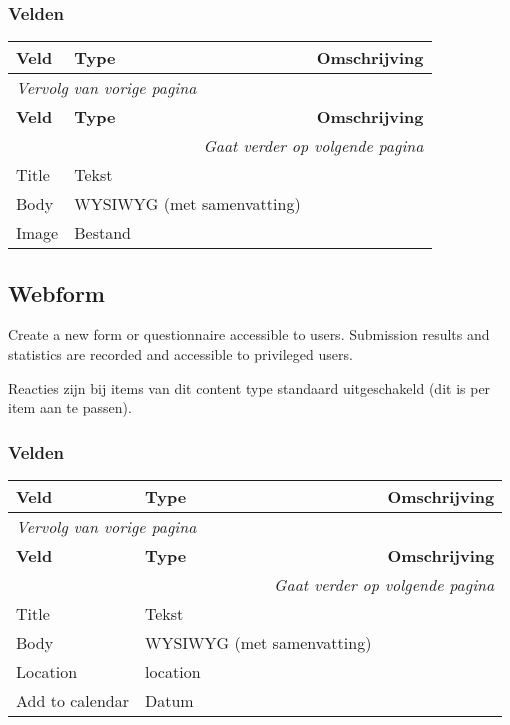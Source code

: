 \subsubsection{Velden}
  \begin{longtable}{| p{3.75cm}|p{3.75cm}|p{7.50cm}|}
  \hline
  \rowcolor{tableheader}
  \textbf{Veld} & \textbf{Type} & \textbf{Omschrijving}  \tabularnewline
  \hline
\endfirsthead
\multicolumn{3}{l}{\textit{Vervolg van vorige pagina}} \\
\hline
\rowcolor{tableheader}
  \textbf{Veld} & \textbf{Type} & \textbf{Omschrijving}  \tabularnewline
  \hline
\hline
\endhead
\multicolumn{3}{r}{\textit{Gaat verder op volgende pagina}} \\
\endfoot
\hline
\endlastfoot
  \raggedright{Title} & \raggedright{Tekst} & \raggedright{}  \tabularnewline
  \hline
  \raggedright{Body} & \raggedright{WYSIWYG (met samenvatting)} & \raggedright{}  \tabularnewline
  \hline
  \raggedright{Image} & \raggedright{Bestand} & \raggedright{}  \tabularnewline
  \hline
  \end{longtable}

\subsection{Webform}
\label{sec:content-webform}
Create a new form or questionnaire accessible to users. Submission results and statistics are recorded and accessible to privileged users.

Reacties zijn bij items van dit content type standaard uitgeschakeld (dit is per item aan te passen).

\subsubsection{Velden}
  \begin{longtable}{| p{3.75cm}|p{3.75cm}|p{7.50cm}|}
  \hline
  \rowcolor{tableheader}
  \textbf{Veld} & \textbf{Type} & \textbf{Omschrijving}  \tabularnewline
  \hline
\endfirsthead
\multicolumn{3}{l}{\textit{Vervolg van vorige pagina}} \\
\hline
\rowcolor{tableheader}
  \textbf{Veld} & \textbf{Type} & \textbf{Omschrijving}  \tabularnewline
  \hline
\hline
\endhead
\multicolumn{3}{r}{\textit{Gaat verder op volgende pagina}} \\
\endfoot
\hline
\endlastfoot
  \raggedright{Title} & \raggedright{Tekst} & \raggedright{}  \tabularnewline
  \hline
  \raggedright{Body} & \raggedright{WYSIWYG (met samenvatting)} & \raggedright{}  \tabularnewline
  \hline
  \raggedright{Location} & \raggedright{location} & \raggedright{}  \tabularnewline
  \hline
  \raggedright{Add to calendar} & \raggedright{Datum} & \raggedright{}  \tabularnewline
  \hline
  \end{longtable}

